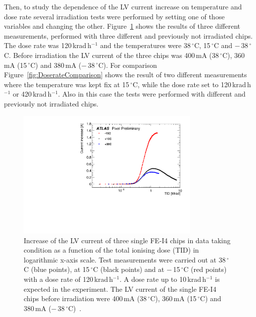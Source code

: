 %
Then, to study the dependence of the LV current increase on temperature and dose rate several irradiation tests were performed by setting one of those  variables and changing the other. 
Figure~\ref{fig:TemperatureComparison} shows the results of three different measurements, performed with 
three different and previously not irradiated chips. The dose rate was 120\,krad\,h$^{-1}$  and the temperatures were 38\,$^\circ$C, 
15\,$^\circ$C and $-$\,38\,$^\circ$C. Before irradiation the LV current of the three chips was 400\,mA (38\,$^\circ$C), 
360\,mA (15\,$^\circ$C) and 380\,mA ($-$\,38\,$^\circ$C).
For comparison Figure~\ref{fig:DoserateComparison} shows the result of two different measurements where the temperature was kept fix at 15\,$^\circ$C, while the dose rate  set to 120\,krad\,h$^{-1}$  or 420\,krad\,h$^{-1}$. Also in this case the tests were performed with different and previously not irradiated chips. 
%
\begin{figure}[h!]
\centering
\includegraphics[width=3.5in]{figures/ElectronicsChapter/ATLAS/TemperatureComparison.pdf}
\caption{Increase of the LV current of three single FE-I4 chips in data taking condition as a function of the total ionising dose (TID) 
in logarithmic x-axis scale. Test measurements were carried out at 38\,$^\circ$C (blue points), at 15\,$^\circ$C (black points) and at $-$\,15\,$^\circ$C (red points) with a dose rate of 120\,krad\,h$^{-1}$. A dose rate up to 10\,krad\,h$^{-1}$ is expected in the experiment. The LV current of the single FE-I4 chips before irradiation were 400\,mA (38\,$^\circ$C), 360\,mA (15\,$^\circ$C) and 380\,mA ($-$\,38\,$^\circ$C)~\cite{TaskForceNote}.}
\label{fig:TemperatureComparison}
\end{figure} 
%
